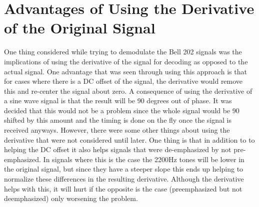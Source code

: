 \section{Advantages of Using the Derivative of the Original Signal}
One thing considered while trying to demodulate the Bell 202 signals was the implications of using the derivative of the signal for decoding as opposed to the actual signal. One advantage that was seen through using this approach is that for cases where there is a DC offset of the signal, the derivative would remove this and re-center the signal about zero. A consequence of using the derivative of a sine wave signal is that the result will be 90 degrees out of phase. It was decided that this would not be a problem since the whole signal would be 90 shifted by this amount and the timing is done on the fly once the signal is received anyways. However, there were some other things about using the derivative that were not considered until later. One thing is that in addition to to helping the DC offset it also helps signals that were de-emphasized by not pre-emphasized. In signals where this is the case the 2200Hz tones will be lower in the original signal, but since they have a steeper slope this ends up helping to normalize these differences in the resulting derivative. Although the derivative helps with this, it will hurt if the opposite is the case (preemphasized but not deemphasized) only worsening the problem.
